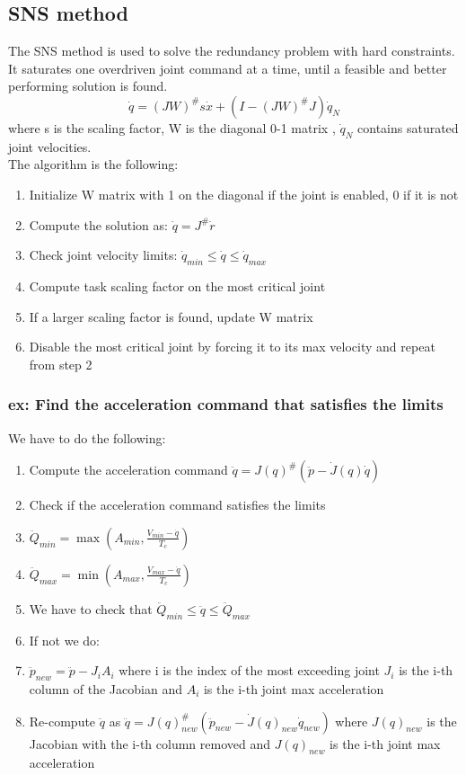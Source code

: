 \documentclass[a4paper,12pt]{article}
\begin{document}
\subsection{SNS method}
The SNS method is used to solve the redundancy 
problem with hard constraints. It saturates one overdriven joint command at a time, until a feasible and better
performing solution is found.
\begin{equation}
    \dot{q} = (JW)^{\#} s\dot{x} + (I - (JW)^{\#}J) \dot{q}_N
\end{equation}
where s is the scaling factor,  W is the diagonal 0-1 matrix
 , $\dot{q}_N$ contains
 saturated
 joint velocities.\\
The algorithm is the following:
\begin{enumerate}
    \item Initialize W matrix with 1 on the diagonal if the joint is enabled, 0 if it is not
    \item Compute the solution as: $\dot{q} = J^\# \dot{r}$
    \item Check joint velocity limits: $\dot{q}_{min} \leq \dot{q} \leq \dot{q}_{max}$
    \item Compute task scaling factor on the most critical joint
    \item If a larger scaling factor is found, update W matrix
    \item Disable the most critical joint by forcing it to its max velocity and repeat from step 2
\end{enumerate}
    \subsubsection{ex: Find the acceleration command that satisfies the limits}
We have to do the following:
\begin{enumerate}
    \item Compute the acceleration command $\ddot{q}=J(q)^{\#}(\ddot{p}-\dot{J}(q)\dot{q})$
    \item Check if the acceleration command satisfies the limits
    \item $\ddot{Q}_{min}= \max(A_{min}, \frac{V_{min}-\dot{q}}{T_c})$
    \item $\ddot{Q}_{max}= \min(A_{max}, \frac{V_{max}-\dot{q}}{T_c})$
    \item We have to check that $\ddot{Q}_{min} \leq \ddot{q} \leq \ddot{Q}_{max}$
    \item If not we do:
    \item $\ddot{p}_{new} = \ddot{p} - J_i A_i$ where i is the 
    index of the most exceeding joint $J_i$ is the i-th column of the Jacobian and $A_i$ is the i-th joint max acceleration
    \item Re-compute $\ddot{q}$ as $\ddot{q}=J(q)^{\#}_{new}(\ddot{p}_{new}-\dot{J}(q)_{new}\dot{q}_{new})$ where 
    $J(q)_{new}$ is the Jacobian with the i-th column removed and $J(q)_{new}$ is the i-th joint max acceleration
\end{enumerate}
\end{document}
